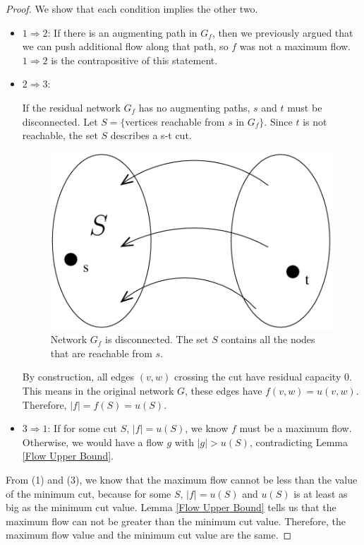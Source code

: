 \documentclass{article}
\begin{document}
\begin{proof}
  We show that each condition implies the other two.

\begin{itemize}
\item $1 \Rightarrow 2$:  If there is an augmenting path in $G_f$,
  then we previously argued that we can push additional flow along that path, so
  $f$ was not a maximum flow.  $1 \Rightarrow 2$ is the contrapositive
  of this statement.

\item $2 \Rightarrow 3$:  

If the residual network $G_f$ has no augmenting paths, $s$ and $t$ must be
  disconnected.  Let $S=\{$vertices reachable from $s$ in $G_f \}$. Since $t$ is not
  reachable, the set $S$ describes a s-t cut.


  \begin{figure}[h]
    \begin{center}
      \includegraphics{il_maxmin.png}
      \caption{Network $G_f$ is disconnected. The set $S$ contains all
      the nodes that are reachable from $s$.}
      \label{fig:ex_maxmin}
    \end{center}
  \end{figure}

  By construction, all edges $(v,w)$ crossing the cut have residual
  capacity 0.  This means in the original network $G$, these edges
  have $f(v,w)=u(v,w)$. Therefore, $|f|=f(S)=u(S)$. 

 \item $3 \Rightarrow 1$: 
  If  for some cut $S$, $|f| = u(S)$, we know $f$ must be a maximum
  flow.  Otherwise, we would have a flow $g$ with $|g| > u(S)$, 
  contradicting Lemma \ref{Flow Upper Bound}.

\end{itemize}

From (1) and (3), we know that the maximum flow cannot be less than the value
  of the minimum cut, because for some $S$, $|f| = u(S)$ and $u(S)$ is at least as
  big as the minimum cut value.  Lemma \ref{Flow Upper Bound} tells us
  that the maximum flow can not be greater than the minimum cut
  value.  Therefore, the maximum flow value and the minimum cut value are
  the same.
\end{proof}
\end{document}
